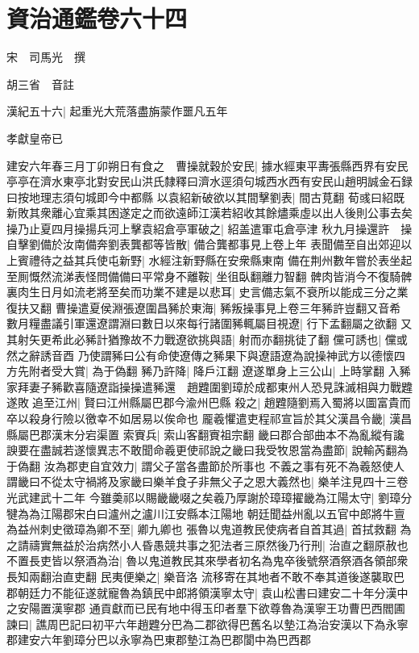 \chapter{資治通鑑卷六十四}
宋　司馬光　撰

胡三省　音註

漢紀五十六|{
	起重光大荒落盡旃蒙作噩凡五年}


孝獻皇帝已

建安六年春三月丁卯朔日有食之　曹操就穀於安民|{
	據水經東平夀張縣西界有安民亭亭在濟水東亭北對安民山洪氏隸釋曰濟水逕須句城西水西有安民山趙明誠金石録曰按地理志須句城即今中都縣}
以袁紹新破欲以其間擊劉表|{
	間古莧翻}
荀彧曰紹既新敗其衆離心宜乘其困遂定之而欲遠師江漢若紹收其餘燼乘虛以出人後則公事去矣操乃止夏四月操揚兵河上擊袁紹倉亭軍破之|{
	紹盖遣軍屯倉亭津}
秋九月操還許　操自擊劉備於汝南備奔劉表龔都等皆散|{
	備合龔都事見上卷上年}
表聞備至自出郊迎以上賓禮待之益其兵使屯新野|{
	水經注新野縣在安衆縣東南}
備在荆州數年嘗於表坐起至厠慨然流涕表怪問備備曰平常身不離鞍|{
	坐徂臥翻離力智翻}
髀肉皆消今不復騎髀裏肉生日月如流老將至矣而功業不建是以悲耳|{
	史言備志氣不衰所以能成三分之業復扶又翻}
曹操遣夏侯淵張遼圍昌豨於東海|{
	豨叛操事見上卷三年豨許豈翻又音希}
數月糧盡議引軍還遼謂淵曰數日以來每行諸圍豨輒屬目視遼|{
	行下孟翻屬之欲翻}
又其射矢更希此必豨計猶豫故不力戰遼欲挑與語|{
	射而亦翻挑徒了翻}
儻可誘也|{
	儻或然之辭誘音酉}
乃使謂豨曰公有命使遼傳之豨果下與遼語遼為說操神武方以德懷四方先附者受大賞|{
	為于偽翻}
豨乃許降|{
	降戶江翻}
遼遂單身上三公山|{
	上時掌翻}
入豨家拜妻子豨歡喜隨遼詣操操遣豨還　趙韙圍劉璋於成都東州人恐見誅滅相與力戰韙遂敗追至江州|{
	賢曰江州縣屬巴郡今渝州巴縣}
殺之|{
	趙韙隨劉焉入蜀將以圖富貴而卒以殺身行險以徼幸不如居易以俟命也}
龎羲懼遣吏程祁宣旨於其父漢昌令畿|{
	漢昌縣屬巴郡漢末分宕渠置}
索賨兵|{
	索山客翻賨祖宗翻}
畿曰郡合部曲本不為亂縱有讒諛要在盡誠若遂懷異志不敢聞命羲更使祁說之畿曰我受牧恩當為盡節|{
	說輸芮翻為于偽翻}
汝為郡吏自宜效力|{
	謂父子當各盡節於所事也}
不義之事有死不為羲怒使人謂畿曰不從太守禍將及家畿曰樂羊食子非無父子之恩大義然也|{
	樂羊注見四十三卷光武建武十二年}
今雖羮祁以賜畿畿啜之矣羲乃厚謝於璋璋擢畿為江陽太守|{
	劉璋分犍為為江陽郡宋白曰瀘州之瀘川江安縣本江陽地}
朝廷聞益州亂以五官中郎將牛亶為益州刺史徵璋為卿不至|{
	卿九卿也}
張魯以鬼道教民使病者自首其過|{
	首拭救翻}
為之請禱實無益於治病然小人昏愚競共事之犯法者三原然後乃行刑|{
	治直之翻原赦也}
不置長吏皆以祭酒為治|{
	魯以鬼道教民其來學者初名為鬼卒後號祭酒祭酒各領部衆長知兩翻治直吏翻}
民夷便樂之|{
	樂音洛}
流移寄在其地者不敢不奉其道後遂襲取巴郡朝廷力不能征遂就寵魯為鎮民中郎將領漢寧太守|{
	袁山松書曰建安二十年分漢中之安陽置漢寧郡}
通貢獻而已民有地中得玉印者羣下欲尊魯為漢寧王功曹巴西閻圃諫曰|{
	譙周巴記曰初平六年趙韙分巴為二郡欲得巴舊名以墊江為治安漢以下為永寧郡建安六年劉璋分巴以永寧為巴東郡墊江為巴郡閬中為巴西郡}
